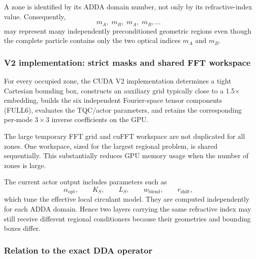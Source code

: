 \documentclass[11pt,a4paper]{article}
\begin{document}
A zone is identified by its ADDA domain number, not only by its refractive-index value. Consequently,
\begin{equation}
m_A,\;m_B,\;m_A,\;m_B,\ldots
\end{equation}
may represent many independently preconditioned geometric regions even though the complete particle contains only the two optical indices \(m_A\) and \(m_B\).

\subsubsection{V2 implementation: strict masks and shared FFT workspace}

For every occupied zone, the CUDA V2 implementation determines a tight Cartesian bounding box, constructs an auxiliary grid typically close to a 1.5\(\times\) embedding, builds the six independent Fourier-space tensor components (FULL6), evaluates the TQC/actor parameters, and retains the corresponding per-mode \(3\times3\) inverse coefficients on the GPU.

The large temporary FFT grid and cuFFT workspace are not duplicated for all zones. One workspace, sized for the largest regional problem, is shared sequentially. This substantially reduces GPU memory usage when the number of zones is large.

The current actor output includes parameters such as
\begin{equation}
\alpha_{\mathrm{opt}},\qquad K_S,\qquad L_S,\qquad
w_{\mathrm{blend}},\qquad r_{\mathrm{shift}},
\end{equation}
which tune the effective local circulant model. They are computed independently for each ADDA domain. Hence two layers carrying the same refractive index may still receive different regional conditioners because their geometries and bounding boxes differ.

\subsubsection{Relation to the exact DDA operator}
\end{document}
